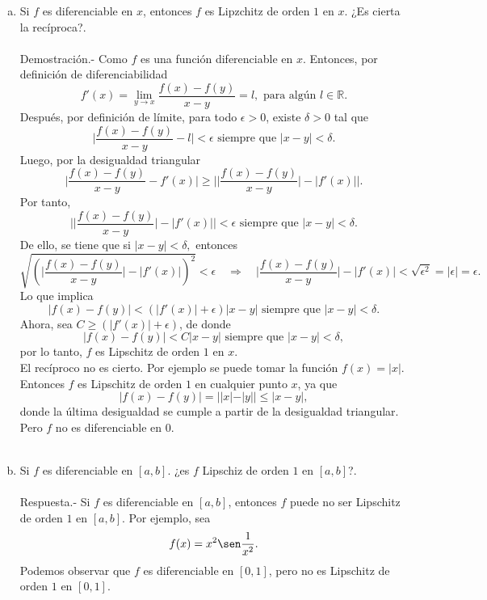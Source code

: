\begin{enumerate}[\bfseries 1.]
\begin{enumerate}[(a)]
	    \item Si $f$ es diferenciable en $x$, entonces $f$ es Lipzchitz de orden $1$ en $x$. ¿Es cierta la recíproca?.\\\\
		Demostración.-\; Como $f$ es una función diferenciable en $x$. Entonces, por definición de diferenciabilidad
		$$f'(x)=\lim_{y\to x}\dfrac{f(x)-f(y)}{x-y}=l, \mbox{ para algún } l\in \mathbb{R}.$$
		Después, por definición de límite,  para todo $\epsilon>0$, existe $\delta>0$ tal que
		$$\bigg|\dfrac{f(x)-f(y)}{x-y}-l\bigg|<\epsilon \mbox{ siempre que } |x-y|<\delta.$$
		Luego, por la desigualdad triangular
		$$\bigg|\dfrac{f(x)-f(y)}{x-y}-f'(x)\bigg| \geq \bigg|\bigg|\dfrac{f(x)-f(y)}{x-y}\bigg|-|f'(x)|\bigg|.$$
		Por tanto,
		$$\bigg|\bigg|\dfrac{f(x)-f(y)}{x-y}\bigg|-|f'(x)|\bigg|<\epsilon \mbox{ siempre que } |x-y|<\delta.$$
		De ello, se tiene que si $|x-y|<\delta,$ entonces
		$$\sqrt{\left(\bigg|\dfrac{f(x)-f(y)}{x-y}\bigg|-|f'(x)|\right)^2}<\epsilon \quad \Rightarrow \quad \bigg|\dfrac{f(x)-f(y)}{x-y}\bigg|-|f'(x)|<\sqrt{\epsilon^2}=|\epsilon|=\epsilon.$$
		Lo que implica 
		$$|f(x)-f(y)|<\left(|f'(x)|+\epsilon\right)|x-y|\mbox{ siempre que } |x-y|<\delta.$$
		Ahora, sea $C\geq\left(|f'(x)|+\epsilon\right)$, de donde
		$$|f(x)-f(y)|<C|x-y|\mbox{ siempre que } |x-y|<\delta,$$
		por lo tanto, $f$ es Lipschitz de orden $1$ en $x$.\\
		El recíproco no es cierto. Por ejemplo se puede tomar la función $f(x)=|x|$. Entonces $f$ es Lipschitz de orden $1$ en cualquier punto $x$, ya que
		$$|f(x)-f(y)|=||x|-|y||\leq |x-y|,$$
		donde la última desigualdad se cumple a partir de la desigualdad triangular. Pero $f$ no es diferenciable en $0$.\\\\

	
	    \item Si $f$ es diferenciable en $[a,b]$. ¿es $f$ Lipschiz de orden $1$ en $[a,b]$?.\\\\
		Respuesta.-\; Si $f$ es diferenciable en $[a,b]$, entonces $f$ puede no ser Lipschitz de orden $1$ en $[a,b]$. Por ejemplo, sea 
		$$f(x)=x^2\sen \dfrac{1}{x^2}.$$
		Podemos observar que $f$ es diferenciable en $[0,1]$, pero no es Lipschitz de orden $1$ en $[0,1]$.\\\\


\end{enumerate}
\end{enumerate}
